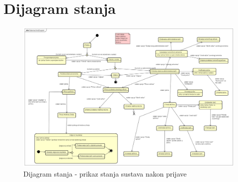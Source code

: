 			\newpage
			
			
			
			\newpage
			
			
			
			
			
			\eject
		
		\section{Dijagram stanja}
			
			
			
			
			\begin{figure}[H]
				\includegraphics[width=\textwidth]{slike/StatemachineDiagram.PNG}
				\caption{Dijagram stanja - prikaz stanja sustava nakon prijave}
				\label{fig:statemachineDiagram}
			\end{figure}
			
			\newpage
			
